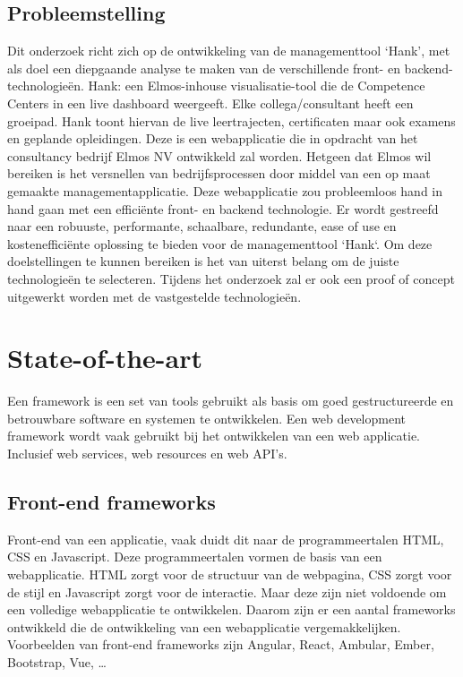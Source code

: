 \documentclass{hogent-article}
\begin{document}
  \subsection{Probleemstelling}%
  \label{sub:probleemstelling}
  Dit onderzoek richt zich op de ontwikkeling van de managementtool `Hank', met als doel een diepgaande analyse te maken van de verschillende front- en backend-technologieën. Hank: een Elmos-inhouse visualisatie-tool die de Competence Centers in een live dashboard weergeeft. Elke collega/consultant heeft een groeipad. Hank toont hiervan de live leertrajecten, certificaten maar ook examens en geplande opleidingen. Deze is een webapplicatie die in opdracht van het consultancy bedrijf Elmos NV ontwikkeld zal worden. Hetgeen dat Elmos wil bereiken is het versnellen van bedrijfsprocessen door middel van een op maat gemaakte managementapplicatie. Deze webapplicatie zou probleemloos hand in hand gaan met een efficiënte front- en backend technologie.
  \bigbreak
  Er wordt gestreefd naar een robuuste, performante, schaalbare, redundante, ease of use en kostenefficiënte oplossing te bieden voor de managementtool `Hank`. Om deze doelstellingen te kunnen bereiken is het van uiterst belang om de juiste technologieën te selecteren. Tijdens het onderzoek zal er ook een proof of concept uitgewerkt worden met de vastgestelde technologieën.


\section{State-of-the-art}%
\label{sec:state-of-the-art}

Een framework is een set van tools gebruikt als basis om goed gestructureerde en betrouwbare software en systemen te ontwikkelen. Een web development framework wordt vaak gebruikt bij het ontwikkelen van een web applicatie. Inclusief web services, web resources en web API's.

\subsection{Front-end frameworks}%
\label{sub:frontend_frameworks}
Front-end van een applicatie, vaak duidt dit naar de programmeertalen HTML, CSS en Ja\-va\-script. Deze programmeertalen vormen de basis van een webapplicatie. HTML zorgt voor de structuur van de webpagina, CSS zorgt voor de stijl en Ja\-va\-script zorgt voor de interactie. Maar deze zijn niet voldoende om een volledige webapplicatie te ontwikkelen. Daarom zijn er een aantal frameworks ontwikkeld die de ontwikkeling van een webapplicatie vergemakkelijken. 
Voorbeelden van front-end frameworks zijn Angular, React, Ambular, Ember, Bootstrap, Vue, \ldots\autocite{Jaiswal2022} 
\end{document}
